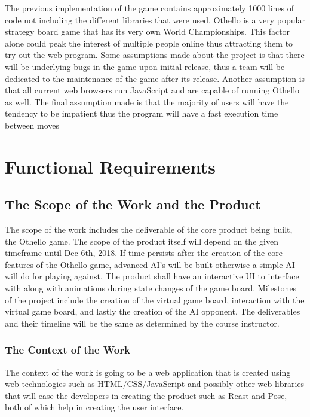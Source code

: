 \documentclass[12pt, titlepage]{article}
\begin{document}
The previous implementation of the game contains approximately 1000 lines of code not including the different libraries that were used. Othello is a very popular strategy board game that has its very own World Championships. This factor alone could peak the interest of multiple people online thus attracting them to try out the web program. Some assumptions made about the project is that there will be underlying bugs in the game upon initial release, thus a team will be dedicated to the maintenance of the game after its release. Another assumption is that all current web browsers run JavaScript and are capable of running Othello as well. The final assumption made is that the majority of users will have the tendency to be impatient thus the program will have a fast execution time between moves

\section{Functional Requirements}

\subsection{The Scope of the Work and the Product}

The scope of the work includes the deliverable of the core product being built, the Othello game. The scope of the product itself will depend on the given timeframe until Dec 6th, 2018. If time persists after the creation of the core features of the Othello game, advanced AI's will be built otherwise a simple AI will do for playing against. The product shall have an interactive UI to interface with along with animations during state changes of the game board. Milestones of the project include the creation of the virtual game board, interaction with the virtual game board, and lastly the creation of the AI opponent. The deliverables and their timeline will be the same as determined by the course instructor.

\subsubsection{The Context of the Work}

The context of the work is going to be a web application that is created using web technologies such as HTML/CSS/JavaScript and possibly other web libraries that will ease the developers in creating the product such as Reast and Pose, both of which help in creating the user interface.
\end{document}
